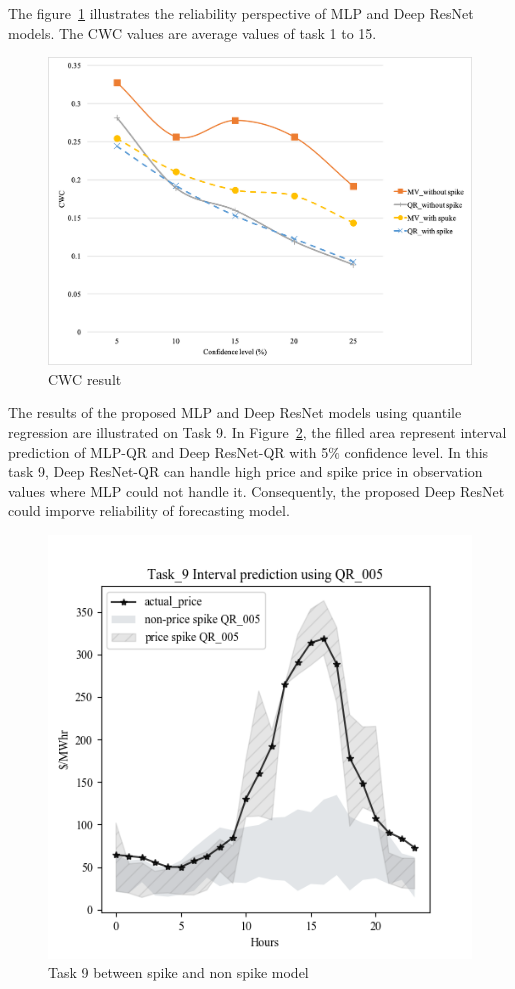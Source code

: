 \documentclass[review]{elsarticle}
\begin{document}
  The figure~\ref{Fig:CWC} illustrates the reliability perspective of MLP and Deep ResNet models. The CWC values are average values of task 1 to 15.
  \begin{figure}[H]
    \includegraphics[width=12cm]{CWC}
    \caption{CWC result}
    \label{Fig:CWC}
  \centering
  \end{figure}


  The results of the proposed MLP and Deep ResNet models using quantile regression are illustrated on Task 9. In Figure~\ref{Fig:compare_spike_and_non_spike_model}, the filled area represent interval prediction of MLP-QR and Deep ResNet-QR with 5$\%$ confidence level. In this task 9, Deep ResNet-QR can handle high price and spike price in observation values where MLP could not handle it. Consequently, the proposed Deep ResNet could imporve reliability of forecasting model.
  \begin{figure}[H]
    \includegraphics[width=12cm]{compare_between_non-spike_and_spike}
    \caption{Task 9 between spike and non spike model}
    \label{Fig:compare_spike_and_non_spike_model}
  \centering
  \end{figure}
\end{document}
